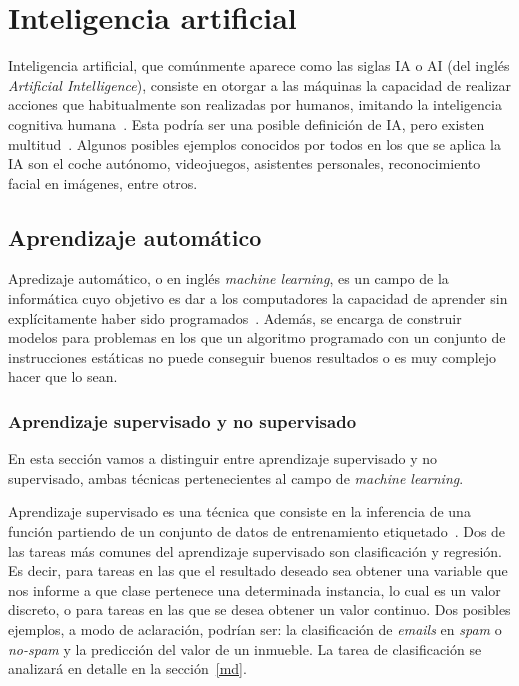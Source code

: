 \section{Inteligencia artificial}

Inteligencia artificial, que comúnmente aparece como las siglas IA o AI (del inglés \textit{Artificial Intelligence}), consiste en otorgar a las máquinas la capacidad de realizar acciones que habitualmente son realizadas por humanos, imitando la inteligencia cognitiva humana~\cite{alanturing:ai}. Esta podría ser una posible definición de IA, pero existen multitud~\cite{russell1995modern}. Algunos posibles ejemplos conocidos por todos en los que se aplica la IA son el coche autónomo, videojuegos, asistentes personales, reconocimiento facial en imágenes, entre otros.

\subsection{Aprendizaje automático}

Apredizaje automático, o en inglés \textit{machine learning}, es un campo de la informática cuyo objetivo es dar a los computadores la capacidad de aprender sin explícitamente haber sido programados~\cite{wiki:machinelearning}. Además, se encarga de construir modelos para problemas en los que un algoritmo programado con un conjunto de instrucciones estáticas no puede conseguir buenos resultados o es muy complejo hacer que lo sean.



\subsubsection{Aprendizaje supervisado y no supervisado}

En esta sección vamos a distinguir entre aprendizaje supervisado y no supervisado, ambas técnicas pertenecientes al campo de \textit{machine learning}.

Aprendizaje supervisado es una técnica que consiste en la inferencia de una función partiendo de un conjunto de datos de entrenamiento etiquetado~\cite{wiki:supervisedLearning}. Dos de las tareas más comunes del aprendizaje supervisado son clasificación y regresión. Es decir, para tareas en las que el resultado deseado sea obtener una variable que nos informe a que clase pertenece una determinada instancia, lo cual es un valor discreto, o para tareas en las que se desea obtener un valor continuo. Dos posibles ejemplos, a modo de aclaración,  podrían ser: la clasificación de \textit{emails} en \textit{spam} o \textit{no-spam} y la predicción del valor de un inmueble. La tarea de clasificación se analizará en detalle en la sección~\ref{md}.

